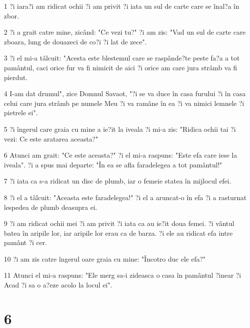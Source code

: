 \par 1 ?i iara?i am ridicat ochii ?i am privit ?i iata un sul de carte care se înal?a în zbor.
\par 2 ?i a grait catre mine, zicând: "Ce vezi tu?" ?i am zis: "Vad un sul de carte care zboara, lung de douazeci de co?i ?i lat de zece".
\par 3 ?i el mi-a tâlcuit: "Acesta este blestemul care se raspânde?te peste fa?a a tot pamântul, caci orice fur va fi nimicit de aici ?i orice am care jura strâmb va fi pierdut.
\par 4 I-am dat drumul", zice Domnul Savaot, "?i se va duce în casa furului ?i în casa celui care jura strâmb pe numele Meu ?i va ramâne în ea ?i va nimici lemnele ?i pietrele ei".
\par 5 ?i îngerul care graia cu mine a ie?it la iveala ?i mi-a zis: "Ridica ochii tai ?i vezi: Ce este aratarea aceasta?"
\par 6 Atunci am grait: "Ce este aceasta?" ?i el mi-a raspuns: "Este efa care iese la iveala". ?i a spus mai departe: "În ea se afla faradelegea a tot pamântul!"
\par 7 ?i iata ca s-a ridicat un disc de plumb, iar o femeie statea în mijlocul efei.
\par 8 ?i el a tâlcuit: "Aceasta este faradelegea!" ?i el a aruncat-o în efa ?i a rasturnat lespedea de plumb deasupra ei.
\par 9 ?i am ridicat ochii mei ?i am privit ?i iata ca au ie?it doua femei. ?i vântul batea în aripile lor, iar aripile lor erau ca de barza. ?i ele au ridicat efa intre pamânt ?i cer.
\par 10 ?i am zis catre îngerul oare graia cu mine: "Încotro duc ele efa?"
\par 11 Atunci el mi-a raspuns: "Ele merg sa-i zideasca o casa în pamântul ?inear ?i Acad ?i sa o a?eze acolo la locul ei".

\chapter{6}

